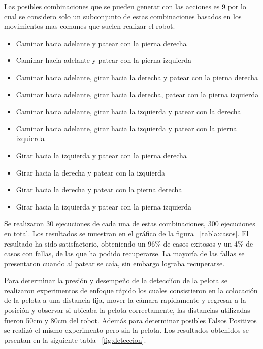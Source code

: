 Las posibles combinaciones que se pueden generar con las acciones es 9\! por lo cual se considero solo un subconjunto de estas combinaciones basados en los movimientos mas comunes que suelen realizar el robot.
\begin{itemize}
\setlength{\itemsep}{1pt}
\item Caminar hacia adelante y patear con la pierna derecha 
\item Caminar hacia adelante y patear con la pierna izquierda
\item Caminar hacia adelante, girar hacia la derecha y patear con la pierna derecha
\item Caminar hacia adelante, girar hacia la derecha, patear con la pierna izquierda 
\item Caminar hacia adelante, girar hacia la izquierda y patear con la derecha
\item Caminar hacia adelante, girar hacia la  izquierda y  patear con la pierna izquierda
\item Girar hacia la izquierda y patear con la pierna derecha
\item Girar hacia la derecha y patear con la izquierda
\item Girar hacia la derecha y patear con la pierna derecha
\item Girar hacia la izquierda y patear con la pierna izquierda
 \end{itemize}

Se realizaron 30 ejecuciones de cada una de estas combinaciones, 300 ejecuciones en total. Los resultados se muestran en el gráfico de la figura ~\ref{tabla:casos}. El resultado ha sido satisfactorio, obteniendo un 96\% de casos exitosos y un 4\% de casos con fallas, de las que ha podido recuperarse. La mayoría de las fallas se presentaron cuando al patear se caía, sin embargo lograba recuperarse.  

Para determinar la presi\'on y desempe\~no de la detecci\'ion de la pelota se realizaron experimentos de enfoque r\'apido los cuales consistieron en la colocaci\'on de la pelota a una distancia fija, mover la c\'amara rapidamente y regresar a la posici\'on y observar si ubicaba la pelota correctamente, las distancias utilizadas fueron 50cm y 80cm del robot. Adem\'as para determinar posibles Falsos Positivos se realiz\'o el mismo experimento pero sin la pelota. Los resultados obtenidos se prsentan en la siguiente tabla ~\ref{fig:deteccion}.

